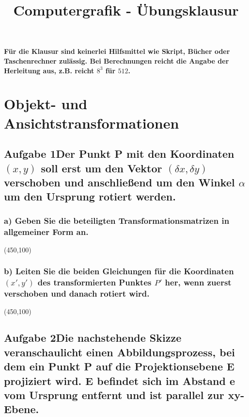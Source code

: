 \documentclass[10pt, a4paper]{article}
\title{Computergrafik - Übungsklausur}
\date{}
\begin{document}
\maketitle
\textbf{Für die Klausur sind keinerlei Hilfsmittel wie Skript, Bücher oder Taschenrechner zulässig. \newline Bei Berechnungen reicht die Angabe der Herleitung aus, z.B. reicht $8^3$ für $512$.}

\section{Objekt- und Ansichtstransformationen}
\subsection{Aufgabe 1\newline Der Punkt P mit den Koordinaten $(x,y)$ soll erst um den Vektor $(\delta x,\delta y)$ verschoben und anschließend um den Winkel $\alpha$ um den Ursprung rotiert werden.}
\subsubsection{a) Geben Sie die beteiligten Transformationsmatrizen in allgemeiner Form an.}
\begin{center}
    \framebox(450,100){}
\end{center}

\subsubsection{b) Leiten Sie die beiden Gleichungen für die Koordinaten $(x',y')$ des transformierten Punktes $P'$ her, wenn zuerst verschoben und danach rotiert wird.}
\begin{center}
    \framebox(450,100){}
\end{center}

\subsection{Aufgabe 2\newline Die nachstehende Skizze veranschaulicht einen Abbildungsprozess, bei dem ein Punkt P auf die Projektionsebene E projiziert wird. E befindet sich im Abstand e vom Ursprung entfernt und ist parallel zur xy-Ebene.}
\begin{figure}[h]
    \centering
\end{figure}
\end{document}
